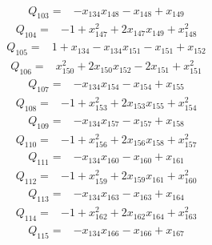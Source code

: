 {\begin{align*}
\end{align*}
\begin{align*}
 Q_{103}={}&-x_{134}x_{148} -x_{148} +x_{149}
\end{align*}
\begin{align*}
 Q_{104}={}&-1 +x_{147}^{2} +2x_{147}x_{149} +x_{148}^{2}
\end{align*}
\begin{align*}
 Q_{105}={}&1 +x_{134} -x_{134}x_{151} -x_{151} +x_{152}
\end{align*}
\begin{align*}
 Q_{106}={}&x_{150}^{2} +2x_{150}x_{152} -2x_{151} +x_{151}^{2}
\end{align*}
\begin{align*}
 Q_{107}={}&-x_{134}x_{154} -x_{154} +x_{155}
\end{align*}
\begin{align*}
 Q_{108}={}&-1 +x_{153}^{2} +2x_{153}x_{155} +x_{154}^{2}
\end{align*}
\begin{align*}
 Q_{109}={}&-x_{134}x_{157} -x_{157} +x_{158}
\end{align*}
\begin{align*}
 Q_{110}={}&-1 +x_{156}^{2} +2x_{156}x_{158} +x_{157}^{2}
\end{align*}
\begin{align*}
 Q_{111}={}&-x_{134}x_{160} -x_{160} +x_{161}
\end{align*}
\begin{align*}
 Q_{112}={}&-1 +x_{159}^{2} +2x_{159}x_{161} +x_{160}^{2}
\end{align*}
\begin{align*}
 Q_{113}={}&-x_{134}x_{163} -x_{163} +x_{164}
\end{align*}
\begin{align*}
 Q_{114}={}&-1 +x_{162}^{2} +2x_{162}x_{164} +x_{163}^{2}
\end{align*}
\begin{align*}
 Q_{115}={}&-x_{134}x_{166} -x_{166} +x_{167}

\end{align*}}
